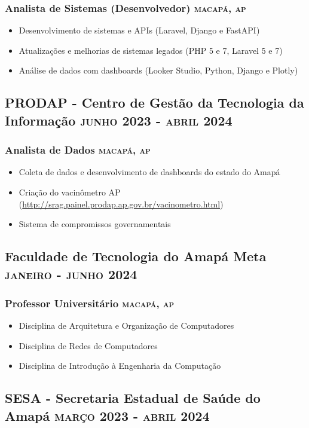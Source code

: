 \documentclass{article}
\newcommand{\rside}[1]{\hfill \normalfont\scshape\MakeLowercase{#1}}
\begin{document}
\subsubsection{Analista de Sistemas (Desenvolvedor) \rside{Macapá, AP}}
\begin{itemize}
  \item Desenvolvimento de sistemas e APIs (Laravel, Django e FastAPI)
  \item Atualizações e melhorias de sistemas legados (PHP 5 e 7, Laravel 5 e 7)
  \item Análise de dados com dashboards (Looker Studio, Python, Django e Plotly)
\end{itemize}

\subsection{PRODAP - Centro de Gestão da Tecnologia da Informação \rside{Junho 2023 - Abril 2024}}
\subsubsection{ Analista de Dados  \rside{Macapá, AP}}
\begin{itemize}
  \item Coleta de dados e desenvolvimento de dashboards do estado do Amapá
  \item Criação do vacinômetro AP (\url{http://srag.painel.prodap.ap.gov.br/vacinometro.html})
  \item Sistema de compromissos governamentais
\end{itemize}

\subsection{Faculdade de Tecnologia do Amapá Meta  \rside{Janeiro - Junho 2024}}
\subsubsection{ Professor Universitário  \rside{Macapá, AP}}
\begin{itemize}
  \item Disciplina de Arquitetura e Organização de Computadores
  \item Disciplina de Redes de Computadores
  \item Disciplina de Introdução à Engenharia da Computação
\end{itemize}


\subsection{SESA - Secretaria Estadual de Saúde do Amapá \rside{Março 2023 - Abril 2024}}
\end{document}
